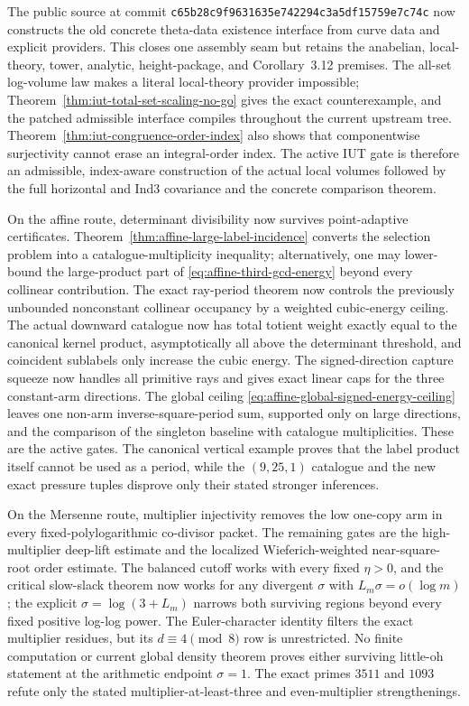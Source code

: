 \documentclass[11pt]{amsart}
\theoremstyle{definition}
\theoremstyle{remark}
\begin{document}
The public source at commit \texttt{c65b28c9f9631635e742294c3a5df15759e7c74c}
now constructs the old concrete theta-data existence interface from curve
data and explicit providers.  This closes one assembly seam but retains the
anabelian, local-theory, tower, analytic, height-package, and Corollary~3.12
premises.  The all-set log-volume law makes a literal local-theory provider
impossible; Theorem~\ref{thm:iut-total-set-scaling-no-go} gives the exact
counterexample, and the patched admissible interface compiles throughout the
current upstream tree.  Theorem~\ref{thm:iut-congruence-order-index} also
shows that componentwise surjectivity cannot erase an integral-order index.
The active IUT gate is therefore an admissible, index-aware construction of
the actual local volumes followed by the full horizontal and Ind3 covariance
and the concrete comparison theorem.

On the affine route, determinant divisibility now survives point-adaptive
certificates.  Theorem~\ref{thm:affine-large-label-incidence} converts the
selection problem into a catalogue-multiplicity inequality; alternatively,
one may lower-bound the large-product part of
\eqref{eq:affine-third-gcd-energy} beyond every collinear contribution.  The
exact ray-period theorem now controls the previously unbounded nonconstant
collinear occupancy by a weighted cubic-energy ceiling.  The actual downward
catalogue now has total totient weight exactly equal to the canonical kernel
product, asymptotically all above the determinant threshold, and coincident
sublabels only increase the cubic energy.  The signed-direction capture
squeeze now handles all primitive rays and gives exact linear caps for the
three constant-arm directions.  The global ceiling
\eqref{eq:affine-global-signed-energy-ceiling} leaves one non-arm
inverse-square-period sum, supported only on large directions, and the
comparison of the singleton baseline with catalogue multiplicities.  These
are the active gates.  The canonical vertical example proves that the label
product itself cannot be used as a period, while the $(9,25,1)$ catalogue and
the new exact pressure tuples disprove only their stated stronger inferences.

On the Mersenne route, multiplier injectivity removes the low one-copy arm in
every fixed-polylogarithmic co-divisor packet.  The remaining gates are the
high-multiplier deep-lift estimate and the localized Wieferich-weighted
near-square-root order estimate.  The balanced cutoff works with every fixed
$\eta>0$, and the critical slow-slack theorem now works for any divergent
$\sigma$ with $L_m\sigma=o(\log m)$; the explicit
$\sigma=\log(3+L_m)$ narrows both surviving regions beyond every fixed
positive log-log power.  The Euler-character identity filters the exact
multiplier residues, but its $d\equiv4\pmod8$ row is unrestricted.  No finite
computation or current global density theorem proves either surviving
little-oh statement at the arithmetic endpoint $\sigma=1$.  The exact primes
$3511$ and $1093$ refute only the stated multiplier-at-least-three and
even-multiplier strengthenings.
\end{document}
